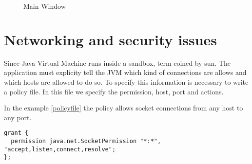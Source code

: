\documentclass[times, 8pt,twocolumn]{article}
\begin{document}
\begin{figure} [H]
    \centering
    \caption{Main Window} 
    \label{fig:papinho1}
\end{figure}

\section{Networking and security issues}

Since Java Virtual Machine runs inside a sandbox, term coined by sun. The application must explicity tell the JVM which kind of connections are allows and which hosts are allowed to do so.
To specify this information is necessary to write a policy file. In this file we specify the permission, host, port and actions. 

In the example \ref{policyfile} the policy allows socket connections from any host to any port. 


\begin{lstlisting}[caption={Policy file},label=policyfile]
grant {
  permission java.net.SocketPermission "*:*", "accept,listen,connect,resolve";
};
\end{lstlisting}
\end{document}
